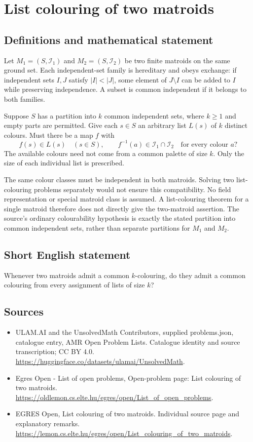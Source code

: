 \documentclass[11pt,a4paper]{article}
\begin{document}
\section*{List colouring of two matroids}\label{statement}

\subsection{Definitions and mathematical statement}
Let $M_1=(S,\mathcal I_1)$ and $M_2=(S,\mathcal I_2)$ be two finite
matroids on the same ground set. Each independent-set family is
hereditary and obeys exchange: if independent sets $I,J$ satisfy
$|I|<|J|$, some element of $J\setminus I$ can be added to $I$
while preserving independence. A subset is common independent if
it belongs to both families.

Suppose $S$ has a partition into $k$ common independent sets, where
$k\ge1$ and empty parts are permitted. Give each $s\in S$ an arbitrary
list $L(s)$ of $k$ distinct colours. Must there be a map $f$ with
\[
 f(s)\in L(s)\quad(s\in S),\qquad
 f^{-1}(a)\in\mathcal I_1\cap\mathcal I_2
                                  \quad\text{for every colour }a?
\]
The available colours need not come from a common palette of size $k$.
Only the size of each individual list is prescribed.

The same colour classes must be independent in both matroids.
Solving two list-colouring problems separately would not ensure this
compatibility. No field representation or special matroid class is
assumed. A list-colouring theorem for a single matroid therefore does
not directly give the two-matroid assertion. The source's ordinary
colourability hypothesis is exactly the stated partition into common
independent sets, rather than separate partitions for $M_1$ and $M_2$.
\subsection{Short English statement}
Whenever two matroids admit a common $k$-colouring, do they admit
a common colouring from every assignment of lists of size $k$?
\subsection{Sources}
\begin{itemize}
\item[S1] ULAM.AI and the UnsolvedMath Contributors, supplied problems.json, catalogue entry, AMR Open Problem Lists. Catalogue identity and source transcription; CC BY 4.0.
\url{https://huggingface.co/datasets/ulamai/UnsolvedMath}.
\item[S2] Egres Open - List of open problems, Open-problem page: List colouring of two matroids. 
\url{https://oldlemon.cs.elte.hu/egres/open/List_of_open_problems}.
\item[S3] EGRES Open, List colouring of two matroids. Individual source page and explanatory remarks.
\url{https://lemon.cs.elte.hu/egres/open/List_colouring_of_two_matroids}.
\end{itemize}
\end{document}
